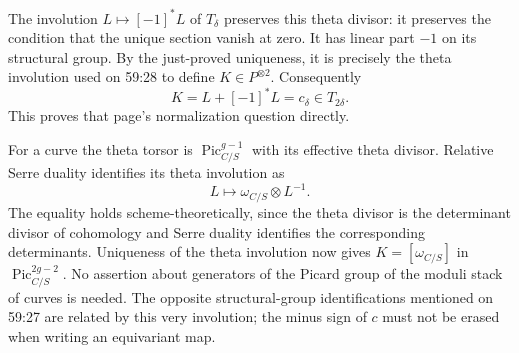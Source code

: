 The involution $L\mapsto[-1]^*L$ of $T_\delta$ preserves this
theta divisor: it preserves the condition that the unique section
vanish at zero.  It has linear part $-1$ on its structural group.
By the just-proved uniqueness, it is precisely the theta involution
used on 59:28 to define $K\in P^{\otimes2}$.  Consequently
\[
 K=L+[-1]^*L=c_\delta\in T_{2\delta}.
\]
This proves that page's normalization question directly.

For a curve the theta torsor is
$\operatorname{Pic}^{g-1}_{C/S}$ with its effective theta divisor.
Relative Serre duality identifies its theta involution as
\[
 L\longmapsto\omega_{C/S}\otimes L^{-1}.
\]
The equality holds scheme-theoretically, since the theta divisor
is the determinant divisor of cohomology and Serre duality
identifies the corresponding determinants.  Uniqueness of the
theta involution now gives
$K=[\omega_{C/S}]$ in $\operatorname{Pic}^{2g-2}_{C/S}$.
No assertion about generators of the Picard group of the moduli
stack of curves is needed.  The opposite structural-group
identifications mentioned on 59:27 are related by this very
involution; the minus sign of $c$ must not be erased when writing
an equivariant map.
